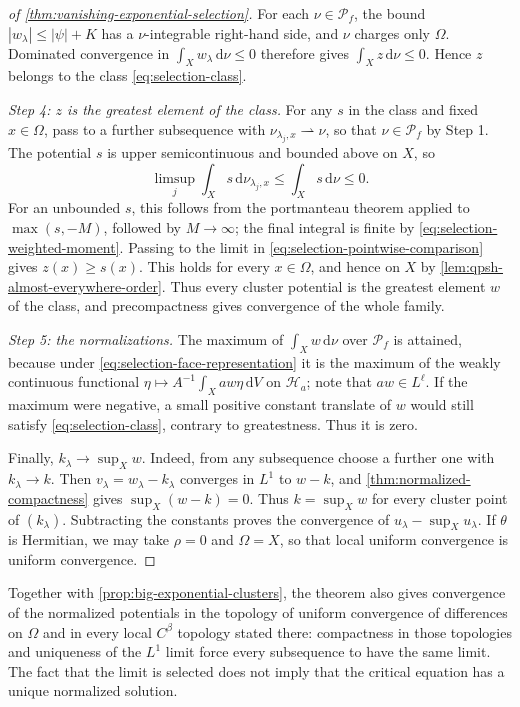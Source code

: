 \begin{proof}[of \cref{thm:vanishing-exponential-selection}]
For each $\nu\in\mathcal P_f$, the bound $|w_\lambda|\leq|\psi|+K$ has a $\nu$-integrable right-hand side, and $\nu$ charges only $\Omega$. Dominated convergence in $\int_Xw_\lambda\,\mathrm{d}\nu\leq0$ therefore gives $\int_Xz\,\mathrm{d}\nu\leq0$. Hence $z$ belongs to the class \eqref{eq:selection-class}.

\emph{Step 4: $z$ is the greatest element of the class.} For any $s$ in the class and fixed $x\in\Omega$, pass to a further subsequence with $\nu_{\lambda_j,x}\rightharpoonup\nu$, so that $\nu\in\mathcal P_f$ by Step 1. The potential $s$ is upper semicontinuous and bounded above on $X$, so
\[
 \limsup_j\int_Xs\,\mathrm{d}\nu_{\lambda_j,x}
       \leq\int_Xs\,\mathrm{d}\nu\leq0.
\]
For an unbounded $s$, this follows from the portmanteau theorem applied to $\max(s,-M)$, followed by $M\to\infty$; the final integral is finite by \eqref{eq:selection-weighted-moment}. Passing to the limit in \eqref{eq:selection-pointwise-comparison} gives $z(x)\geq s(x)$. This holds for every $x\in\Omega$, and hence on $X$ by \cref{lem:qpsh-almost-everywhere-order}. Thus every cluster potential is the greatest element $w$ of the class, and precompactness gives convergence of the whole family.

\emph{Step 5: the normalizations.} The maximum of $\int_Xw\,\mathrm{d}\nu$ over $\mathcal P_f$ is attained, because under \eqref{eq:selection-face-representation} it is the maximum of the weakly continuous functional $\eta\mapsto A^{-1}\int_Xaw\eta\,\mathrm{d}V$ on $\mathcal H_a$; note that $aw\in L^\ell$. If the maximum were negative, a small positive constant translate of $w$ would still satisfy \eqref{eq:selection-class}, contrary to greatestness. Thus it is zero.

Finally, $k_\lambda\to\sup_Xw$. Indeed, from any subsequence choose a further one with $k_\lambda\to k$. Then $v_\lambda=w_\lambda-k_\lambda$ converges in $L^1$ to $w-k$, and \cref{thm:normalized-compactness} gives $\sup_X(w-k)=0$. Thus $k=\sup_Xw$ for every cluster point of $(k_\lambda)$. Subtracting the constants proves the convergence of $u_\lambda-\sup_Xu_\lambda$. If $\theta$ is Hermitian, we may take $\rho=0$ and $\Omega=X$, so that local uniform convergence is uniform convergence.
\end{proof}

Together with \cref{prop:big-exponential-clusters}, the theorem also gives convergence of the normalized potentials in the topology of uniform convergence of differences on $\Omega$ and in every local $C^\beta$ topology stated there: compactness in those topologies and uniqueness of the $L^1$ limit force every subsequence to have the same limit. The fact that the limit is selected does not imply that the critical equation has a unique normalized solution.
